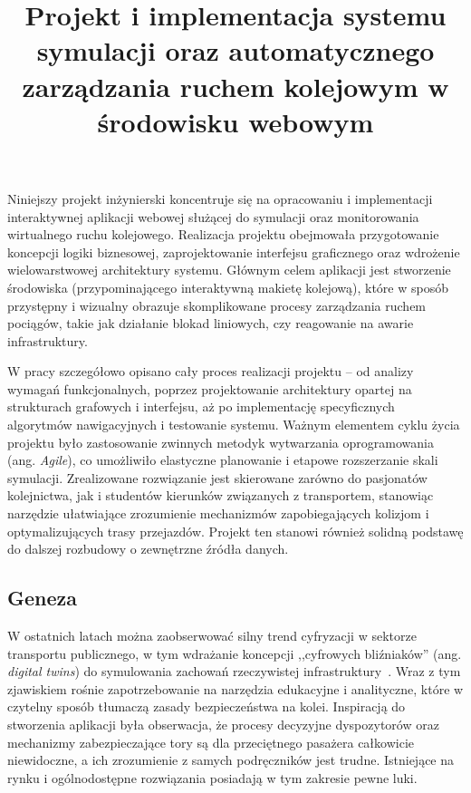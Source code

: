 \documentclass[twoside]{projektInzynierskiMS1z}
\title{Projekt i implementacja systemu symulacji oraz automatycznego
zarządzania ruchem kolejowym w środowisku webowym}
\begin{document}
\onehalfspacing


Niniejszy projekt inżynierski koncentruje się na opracowaniu i implementacji
interaktywnej aplikacji webowej służącej do symulacji oraz monitorowania
wirtualnego ruchu kolejowego. Realizacja projektu obejmowała przygotowanie
koncepcji logiki biznesowej, zaprojektowanie interfejsu graficznego oraz
wdrożenie wielowarstwowej architektury systemu. Głównym celem aplikacji jest
stworzenie środowiska (przypominającego interaktywną makietę kolejową), które
w sposób przystępny i wizualny obrazuje skomplikowane procesy zarządzania ruchem
pociągów, takie jak działanie blokad liniowych, czy reagowanie na awarie
infrastruktury.

W pracy szczegółowo opisano cały proces realizacji projektu -- od analizy
wymagań funkcjonalnych, poprzez projektowanie architektury opartej na strukturach
grafowych i interfejsu, aż po implementację specyficznych algorytmów nawigacyjnych
i testowanie systemu. Ważnym elementem cyklu życia projektu było zastosowanie
zwinnych metodyk wytwarzania oprogramowania (ang. \emph{Agile}), co umożliwiło
elastyczne planowanie i etapowe rozszerzanie skali symulacji. Zrealizowane
rozwiązanie jest skierowane zarówno do pasjonatów kolejnictwa, jak i studentów
kierunków związanych z transportem, stanowiąc narzędzie ułatwiające zrozumienie
mechanizmów zapobiegających kolizjom i optymalizujących trasy przejazdów. Projekt
ten stanowi również solidną podstawę do dalszej rozbudowy o zewnętrzne źródła
danych.

\subsection{Geneza}

W ostatnich latach można zaobserwować silny trend cyfryzacji w sektorze transportu
publicznego, w tym wdrażanie koncepcji ,,cyfrowych bliźniaków'' (ang. \emph{digital
twins}) do symulowania zachowań rzeczywistej infrastruktury~\cite{digitaltwin}.
Wraz z tym zjawiskiem rośnie zapotrzebowanie na narzędzia edukacyjne i analityczne,
które w czytelny sposób tłumaczą zasady bezpieczeństwa na kolei. Inspiracją do
stworzenia aplikacji była obserwacja, że procesy decyzyjne dyspozytorów oraz
mechanizmy zabezpieczające tory są dla przeciętnego pasażera całkowicie niewidoczne,
a ich zrozumienie z samych podręczników jest trudne. Istniejące na rynku
i ogólnodostępne rozwiązania posiadają w tym zakresie pewne luki.
\end{document}
